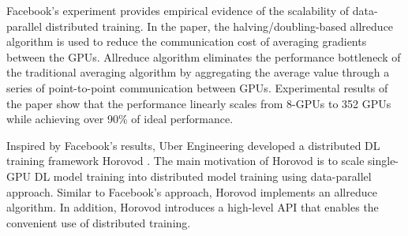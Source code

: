 Facebook's experiment \cite{facebook2018} provides empirical evidence of
the scalability of data-parallel distributed training. In the paper, 
the halving/doubling-based allreduce algorithm is used to reduce the communication 
cost of averaging gradients between the GPUs. 
Allreduce algorithm eliminates the performance bottleneck of the traditional
averaging algorithm by aggregating the average value through a series of
point-to-point communication between GPUs. 
Experimental results of the paper show that the performance linearly
scales from 8-GPUs to 352 GPUs while achieving over 90\% of ideal performance.

Inspired by Facebook's results, Uber Engineering developed a distributed DL
training framework Horovod \cite{sergeev2018horovod}. 
The main motivation of Horovod is to scale single-GPU DL model training
into distributed model training using data-parallel approach. 
Similar to Facebook's approach, Horovod implements an allreduce algorithm. 
In addition, Horovod introduces a high-level API that enables
the convenient use of distributed training.  
